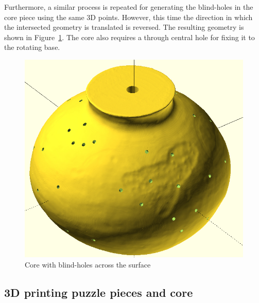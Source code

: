 \documentclass[acmlarge,screen,dvipsnames]{acmart}
\begin{document}
Furthermore, a similar process is repeated for generating the
blind-holes in the core piece using the same 3D points. However, this
time the direction in which the intersected geometry is translated is
reversed. The resulting geometry is shown in
Figure~\ref{fig:coreholes}. The core also requires a through central
hole for fixing it to the rotating base.
%
\begin{figure}[h]
  \centering
  \includegraphics[width=0.6\linewidth]{images/coreholes.jpg}
  \caption{\label{fig:coreholes}%
    Core with blind-holes across the surface}
\end{figure}


\subsection{3D printing puzzle pieces and core}
\end{document}
